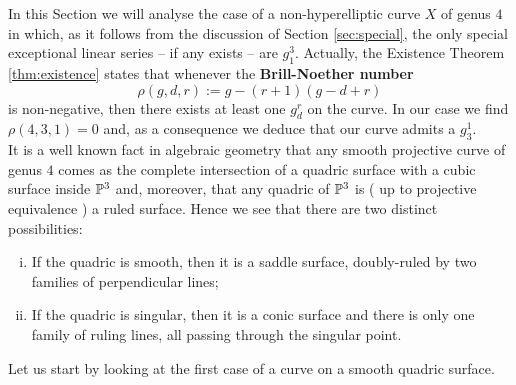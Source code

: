 	In this Section we will analyse the case of a non-hyperelliptic curve $X$ of genus $4$ in which, as it follows from the discussion of Section \ref{sec:special}, the only special exceptional linear series -- if any exists -- are $g_1^3$.  
	Actually, the Existence Theorem \ref{thm:existence} states that whenever the \textbf{Brill-Noether number}
	$$ \rho(g,d,r) := g - (r+1)(g-d+r) $$
	is non-negative, then there exists at least one $g_d^r$ on the curve. In our case we find $\rho(4,3,1)=0$ and, as a consequence we deduce that our curve admits a $g_3^1$.\\
	It is a well known fact in algebraic geometry that any smooth projective curve of genus $4$ comes as the complete intersection of a quadric surface with a cubic surface inside $\mathbb{P}^3$ and, moreover, that any quadric of $\mathbb{P}^3$ is ( up to projective equivalence ) a ruled surface. Hence we see that there are two distinct possibilities:
	\begin{enumerate}[i)]
		\item If the quadric is smooth, then it is a saddle surface, doubly-ruled by two families of perpendicular lines;
		\item If the quadric is singular, then it is a conic surface and there is only one family of ruling lines, all passing through the singular point. 
 	\end{enumerate}
 	Let us start by looking at the first case of a curve on a smooth quadric surface.

